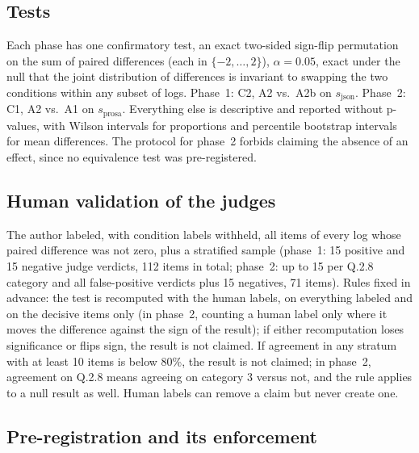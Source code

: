 \documentclass[11pt]{article}
\begin{document}
\subsection{Tests}

Each phase has one confirmatory test, an exact two-sided sign-flip permutation on the
sum of paired differences (each in $\{-2,\dots,2\}$), $\alpha = 0.05$, exact under the
null that the joint distribution of differences is invariant to swapping the two
conditions within any subset of logs. Phase~1: C2, A2 vs.\ A2b on $s_{\text{json}}$.
Phase~2: C1, A2 vs.\ A1 on $s_{\text{prosa}}$. Everything else is descriptive and
reported without p-values, with Wilson intervals for proportions and percentile
bootstrap intervals for mean differences. The protocol for phase~2 forbids claiming the
absence of an effect, since no equivalence test was pre-registered.

\subsection{Human validation of the judges}

The author labeled, with condition labels withheld, all items of every log whose
paired difference was not zero, plus a stratified sample (phase~1: 15 positive and 15
negative judge verdicts, 112 items in total; phase~2: up to 15 per Q.2.8 category and
all false-positive verdicts plus 15 negatives, 71 items). Rules fixed in advance: the
test is recomputed with the human labels, on everything labeled and on the decisive
items only (in phase~2, counting a human label only where it moves the difference
against the sign of the result); if either recomputation loses significance or flips
sign, the result is not claimed. If agreement in any stratum with at least 10 items is
below 80\%, the result is not claimed; in phase~2, agreement on Q.2.8 means agreeing on
category 3 versus not, and the rule applies to a null result as well. Human labels can
remove a claim but never create one.

\subsection{Pre-registration and its enforcement}
\label{sec:prereg}
\end{document}
